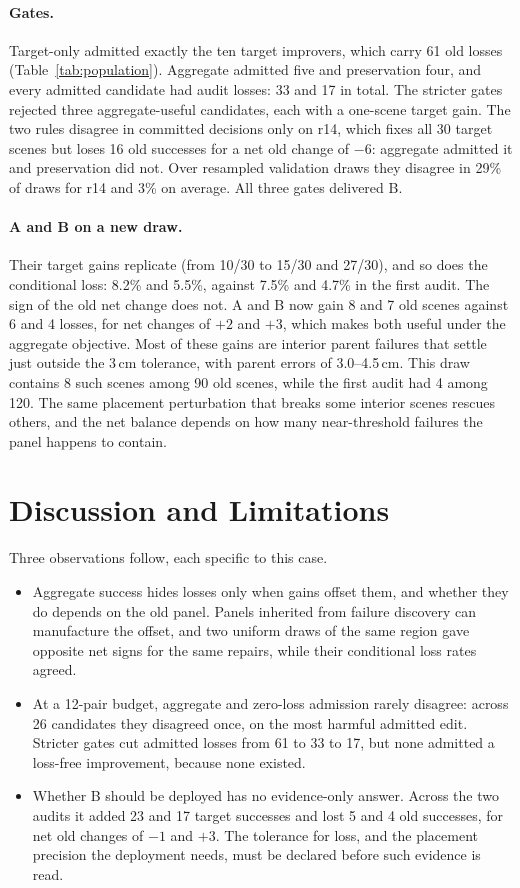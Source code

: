 \documentclass[letterpaper]{article} %
\begin{document}
\paragraph{Gates.} Target-only admitted exactly the ten target improvers, which carry 61 old losses (Table~\ref{tab:population}). Aggregate admitted five and preservation four, and every admitted candidate had audit losses: 33 and 17 in total. The stricter gates rejected three aggregate-useful candidates, each with a one-scene target gain. The two rules disagree in committed decisions only on r14, which fixes all 30 target scenes but loses 16 old successes for a net old change of $-6$: aggregate admitted it and preservation did not. Over resampled validation draws they disagree in 29\% of draws for r14 and 3\% on average. All three gates delivered B.

\paragraph{A and B on a new draw.} Their target gains replicate (from 10/30 to 15/30 and 27/30), and so does the conditional loss: 8.2\% and 5.5\%, against 7.5\% and 4.7\% in the first audit. The sign of the old net change does not. A and B now gain 8 and 7 old scenes against 6 and 4 losses, for net changes of $+2$ and $+3$, which makes both useful under the aggregate objective. Most of these gains are interior parent failures that settle just outside the 3\,cm tolerance, with parent errors of 3.0--4.5\,cm. This draw contains 8 such scenes among 90 old scenes, while the first audit had 4 among 120. The same placement perturbation that breaks some interior scenes rescues others, and the net balance depends on how many near-threshold failures the panel happens to contain.

\section{Discussion and Limitations}
Three observations follow, each specific to this case.
\begin{itemize}
\item Aggregate success hides losses only when gains offset them, and whether they do depends on the old panel. Panels inherited from failure discovery can manufacture the offset, and two uniform draws of the same region gave opposite net signs for the same repairs, while their conditional loss rates agreed.
\item At a 12-pair budget, aggregate and zero-loss admission rarely disagree: across 26 candidates they disagreed once, on the most harmful admitted edit. Stricter gates cut admitted losses from 61 to 33 to 17, but none admitted a loss-free improvement, because none existed.
\item Whether B should be deployed has no evidence-only answer. Across the two audits it added 23 and 17 target successes and lost 5 and 4 old successes, for net old changes of $-1$ and $+3$. The tolerance for loss, and the placement precision the deployment needs, must be declared before such evidence is read.
\end{itemize}
\end{document}
